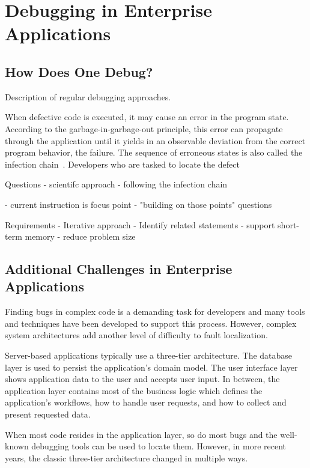 \chapter{Debugging in Enterprise Applications}

\section{How Does One Debug?}

Description of regular debugging approaches.

When defective code is executed, it may cause an error in the program state.
According to the garbage-in-garbage-out principle, this error can propagate through the application until it yields in an observable deviation from the correct program behavior, the failure.
The sequence of erroneous states is also called the infection chain~\cite{zeller_09_why_programs_fail}.
Developers who are tasked to locate the defect

Questions
- scientifc approach
- following the infection chain

- current instruction is focus point
- "building on those points" questions 

Requirements
- Iterative approach
- Identify related statements
- support short-term memory
- reduce problem size

\section{Additional Challenges in Enterprise Applications}

Finding bugs in complex code is a demanding task for developers and many tools and techniques have been developed to support this process.
However, complex system architectures add another level of difficulty to fault localization.

Server-based applications typically use a three-tier architecture.
The database layer is used to persist the application's domain model.
The user interface layer shows application data to the user and accepts user input.
In between, the application layer contains most of the business logic which defines the application's workflows, how to handle user requests, and how to collect and present requested data.

When most code resides in the application layer, so do most bugs and the well-known debugging tools can be used to locate them.
However, in more recent years, the classic three-tier architecture changed in multiple ways.

